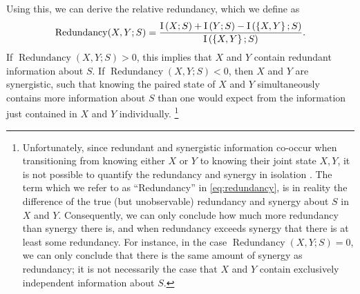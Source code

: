 Using this, we can derive the relative redundancy, which we define as
\begin{equation}
\label{eq:redundancy}
\operatorname{Redundancy}(X,Y;S)=\frac{
\operatorname{I}\left(X;S\right) + \operatorname{I}\left(Y;S\right) - \operatorname{I}\left(\left\{X,Y\right\};S\right)
}{
\operatorname{I}\left(\left\{X,Y\right\};S\right)
}
.\end{equation}
If $\operatorname{Redundancy}\left(X,Y;S\right) > 0$, this implies that $X$ and $Y$ contain redundant information about $S$.
If $\operatorname{Redundancy}\left(X,Y;S\right) < 0$, then $X$ and $Y$ are synergistic, such that knowing the paired state of $X$ and $Y$ simultaneously contains more information about $S$ than one would expect from the information just contained in $X$ and $Y$ individually.%
\footnote{%
\label{foot:redundancy_synergy}%
Unfortunately, since redundant and synergistic information co-occur when transitioning from knowing either $X$ or $Y$ to knowing their joint state ${X,Y}$, it is not possible to quantify the redundancy and synergy in isolation \citep{Latham2005,Averbeck2006,Williams2010,Griffith2014,Banerjee2015}.
The term which we refer to as ``Redundancy'' in \autoref{eq:redundancy}, is in reality the difference of the true (but unobservable) redundancy and synergy about $S$ in $X$ and $Y$.
Consequently, we can only conclude how much more redundancy than synergy there is, and when redundancy exceeds synergy that there is at least some redundancy.
For instance, in the case $\operatorname{Redundancy}\left(X,Y;S\right) = 0$, we can only conclude that there is the same amount of synergy as redundancy; it is not necessarily the case that $X$ and $Y$ contain exclusively independent information about $S$.
}

